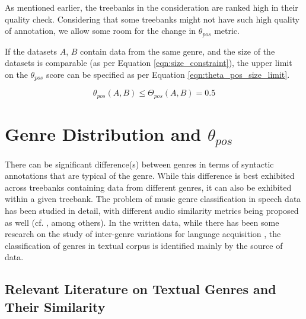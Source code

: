 As mentioned earlier, the treebanks in the consideration are ranked high in their quality check. Considering that some treebanks might not have such high quality of annotation, we allow some room for the change in $\theta_{pos}$ metric. 

If the datasets $A$, $B$ contain data from the same genre, and the size of the datasets is comparable (as per Equation \ref{eqn:size_constraint}), the upper limit on the $\theta_{pos}$ score can be specified as per Equation \ref{eqn:theta_pos_size_limit}.

\begin{equation}
    \boxed{\theta_{pos}(A,B) \leq \Theta_{pos}(A,B) = 0.5}
\label{eqn:theta_pos_size_limit}
\end{equation}

\section{Genre Distribution and \texorpdfstring{$\theta_{pos}$}{theta\_pos}}
\label{sec:pos-harmony-genre}

There can be significant difference(s) between genres in terms of syntactic annotations that are typical of the genre. While this difference is best exhibited across treebanks containing data from different genres, it can also be exhibited within a given treebank. The problem of music genre classification in speech data has been studied in detail, with different audio similarity metrics being proposed as well (cf. \cite{music1, music2}, among others). In the written data, while there has been some research on the study of inter-genre variations for language acquisition \citep{genre-acquisition1}, the classification of genres in textual corpus is identified mainly by the source of data.

\subsection{Relevant Literature on Textual Genres and Their Similarity}

